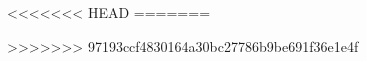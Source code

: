 \newcommand{\terminologyItem}[1]{\textbf{\uwave{#1}}}

\newcommand{\myKeypoint}[1]{\textbf{\uline{#1}}}

<<<<<<< HEAD
\newcommand{\Bioconductor}{\href{http://www.bioconductor.org/}{Bioconductor}}
=======
\newtheorem{定义}{定义}

\newtheorem{定理}{定理}
\newtheorem{推论}{推论}
\newtheorem{引理}{引理}
\newtheorem{性质}{性质}
>>>>>>> 97193ccf4830164a30bc27786b9be691f36e1e4f
